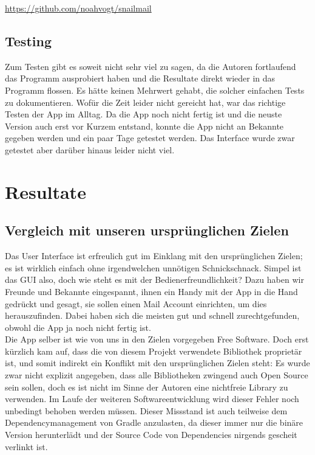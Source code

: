 \documentclass[a4paper,11pt]{article}
\begin{document}
\url{https://github.com/noahvogt/snailmail}

\subsection{Testing}

Zum Testen gibt es soweit nicht sehr viel zu sagen, da die Autoren fortlaufend das Programm ausprobiert haben und die Resultate direkt wieder in das Programm flossen.
Es hätte keinen Mehrwert gehabt, die  solcher einfachen Tests zu dokumentieren. Wofür die Zeit leider nicht gereicht hat, war das 
richtige Testen der App im Alltag. Da die App noch nicht fertig ist und die neuste Version auch erst vor Kurzem entstand, konnte die App nicht an Bekannte gegeben werden
und ein paar Tage getestet werden. Das Interface wurde zwar getestet aber darüber hinaus leider nicht viel.

\section{Resultate}
\subsection{Vergleich mit unseren ursprünglichen Zielen}
Das User Interface ist erfreulich gut im Einklang mit den ursprünglichen Zielen; es ist wirklich einfach ohne irgendwelchen unnötigen Schnickschnack. Simpel ist das GUI also, doch wie steht es mit der Bedienerfreundlichkeit? Dazu haben wir Freunde und Bekannte eingespannt, ihnen ein Handy mit der App in die Hand gedrückt und gesagt, sie sollen einen Mail Account einrichten, um dies herauszufinden. Dabei haben sich die meisten gut und schnell zurechtgefunden, obwohl die App ja noch nicht fertig ist.\\

Die App selber ist wie von uns in den Zielen vorgegeben Free Software. Doch erst kürzlich kam auf, dass die von diesem Projekt verwendete  Bibliothek proprietär ist, und somit indirekt ein Konflikt mit den ursprünglichen Zielen steht: Es wurde zwar nicht explizit angegeben, dass alle Bibliotheken zwingend auch Open Source sein sollen, doch es ist nicht im Sinne der Autoren eine nichtfreie Library zu verwenden. Im Laufe der weiteren Softwareentwicklung wird dieser Fehler noch unbedingt behoben werden müssen. Dieser Missstand ist auch teilweise dem Dependencymanagement von Gradle anzulasten, da dieser immer nur die binäre Version herunterlädt und der Source Code von Dependencies nirgends gescheit verlinkt ist.\\
\end{document}
